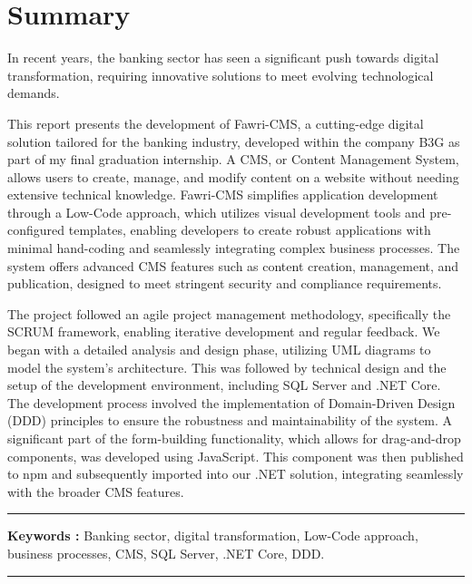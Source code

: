 \chapter*{Summary}

\hspace{\parindent}  In recent years, the banking sector has seen a significant push towards digital transformation, requiring innovative solutions to meet evolving technological demands.

This report presents the development of Fawri-CMS, a cutting-edge digital solution tailored for the banking industry, developed within the company B3G as part of my final graduation internship. A CMS, or Content Management System, allows users to create, manage, and modify content on a website without needing extensive technical knowledge. Fawri-CMS simplifies application development through a Low-Code approach, which utilizes visual development tools and pre-configured templates, enabling developers to create robust applications with minimal hand-coding and seamlessly integrating complex business processes. The system offers advanced CMS features such as content creation, management, and publication, designed to meet stringent security and compliance requirements.

The project followed an agile project management methodology, specifically the SCRUM
framework, enabling iterative development and regular feedback. We began with a detailed analysis and design phase, utilizing UML diagrams to model the system’s architecture. This was followed by technical design and the setup of the development environment, including SQL Server and .NET Core.
The development process involved the implementation of Domain-Driven Design (DDD) principles to ensure the robustness and maintainability of the system. A significant part of the form-building functionality, which allows for drag-and-drop components, was developed using JavaScript. This component was then published to npm and subsequently imported into our .NET solution, integrating seamlessly with the broader CMS features.

\noindent\rule[2pt]{\textwidth}{0.5pt}

{\textbf{Keywords :}}
Banking sector, digital transformation, Low-Code approach, business
processes, CMS, SQL Server, .NET Core, DDD.
\\
\noindent\rule[2pt]{\textwidth}{0.5pt}